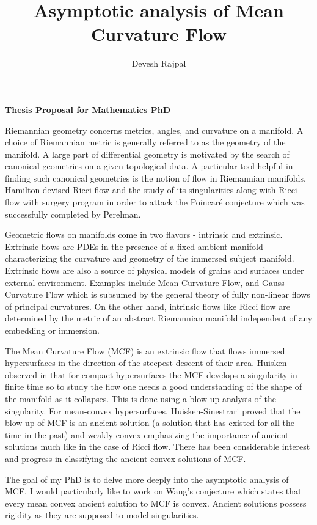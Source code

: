 \documentclass[12pt]{article}
\title{Asymptotic analysis of Mean Curvature Flow}
\author{Devesh Rajpal}
\date{}
\begin{document}
\maketitle
\begin{center}
   \textbf{Thesis Proposal for Mathematics PhD} 
\end{center}


Riemannian geometry concerns metrics, angles, and curvature on a manifold. A choice of Riemannian metric is generally referred to as the geometry of the manifold. A large part of differential geometry is motivated by the search of canonical geometries on a given topological data. A particular tool helpful in finding such canonical geometries is the notion of flow in Riemannian manifolds. %
Hamilton devised Ricci flow and the study of its singularities along with Ricci flow with surgery program in order to attack the Poincar\'{e} conjecture %
which was successfully completed by Perelman. 

Geometric flows on manifolds come in two flavors - intrinsic and extrinsic. Extrinsic flows are PDEs in the presence of a fixed ambient manifold characterizing the curvature and geometry of the immersed subject manifold. Extrinsic flows are also a source of physical models of grains and surfaces under external environment. Examples include Mean Curvature Flow, and Gauss Curvature Flow which is subsumed by the general theory of fully non-linear flows of principal curvatures. On the other hand, intrinsic flows like Ricci flow are determined by the metric of an abstract Riemannian manifold independent of any embedding or immersion. 

The Mean Curvature Flow (MCF) is an extrinsic flow that flows immersed hypersurfaces  %
in the direction of the steepest descent of their area. Huisken observed in \cite{huisken1984flow} that for compact hypersurfaces the MCF develops a singularity in finite time so to study the flow one needs a good understanding of the shape of the manifold as it collapses. This is done using a blow-up analysis of the singularity. For mean-convex hypersurfaces, Huisken-Sinestrari proved that the blow-up of MCF is an ancient solution (a solution that has existed for all the time in the past) and weakly convex emphasizing the importance of ancient solutions much like in the case of Ricci flow. There has been considerable interest and progress in classifying the ancient convex solutions of MCF. 

The goal of my PhD is to delve more deeply into the asymptotic analysis of MCF. I would particularly like to work on Wang's conjecture which states that every mean convex ancient solution to MCF is convex.  %
Ancient solutions possess rigidity as they are supposed to model singularities.

\newpage

\nocite{*}
\end{document}
